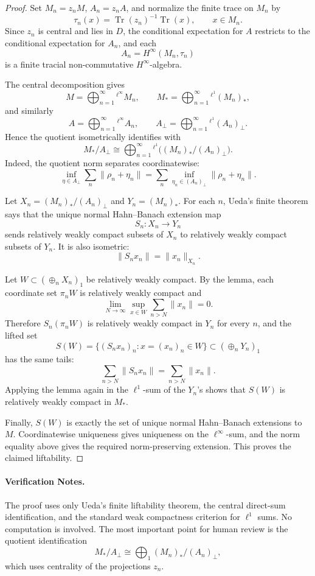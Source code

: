 \documentclass[11pt]{article}
\begin{document}
\begin{proof}
Set \(M_n=z_nM\), \(A_n=z_nA\), and normalize the finite trace on \(M_n\) by
\[
\tau_n(x)=\operatorname{Tr}(z_n)^{-1}\operatorname{Tr}(x),\qquad x\in M_n.
\]
Since \(z_n\) is central and lies in \(D\), the conditional expectation for
\(A\) restricts to the conditional expectation for \(A_n\), and each
\[
A_n=H^\infty(M_n,\tau_n)
\]
is a finite tracial non-commutative \(H^\infty\)-algebra.

The central decomposition gives
\[
M=\bigoplus_{n=1}^{\infty}{}^{\ell^\infty} M_n,\qquad
M_\ast=\bigoplus_{n=1}^{\infty}{}^{\ell^1} (M_n)_\ast,
\]
and similarly
\[
A=\bigoplus_{n=1}^{\infty}{}^{\ell^\infty} A_n,\qquad
A_\perp=\bigoplus_{n=1}^{\infty}{}^{\ell^1} (A_n)_\perp.
\]
Hence the quotient isometrically identifies with
\[
M_\ast/A_\perp
\cong
\bigoplus_{n=1}^{\infty}{}^{\ell^1}
\big((M_n)_\ast/(A_n)_\perp\big).
\]
Indeed, the quotient norm separates coordinatewise:
\[
\inf_{\eta\in A_\perp}\sum_n \|\rho_n+\eta_n\|
=
\sum_n \inf_{\eta_n\in(A_n)_\perp}\|\rho_n+\eta_n\|.
\]

Let \(X_n=(M_n)_\ast/(A_n)_\perp\) and \(Y_n=(M_n)_\ast\).  For each \(n\),
Ueda's finite theorem says that the unique normal Hahn--Banach extension map
\[
S_n:X_n\to Y_n
\]
sends relatively weakly compact subsets of \(X_n\) to relatively weakly
compact subsets of \(Y_n\).  It is also isometric:
\[
\|S_n x_n\|=\|x_n\|_{X_n}.
\]

Let \(W\subset(\oplus_n X_n)_1\) be relatively weakly compact.  By the lemma,
each coordinate set \(\pi_n W\) is relatively weakly compact and
\[
\lim_{N\to\infty}\sup_{x\in W}\sum_{n>N}\|x_n\|=0.
\]
Therefore \(S_n(\pi_n W)\) is relatively weakly compact in \(Y_n\) for every
\(n\), and the lifted set
\[
S(W)=\{(S_nx_n)_n:x=(x_n)_n\in W\}\subset(\oplus_nY_n)_1
\]
has the same tails:
\[
\sum_{n>N}\|S_nx_n\|=\sum_{n>N}\|x_n\|.
\]
Applying the lemma again in the \(\ell^1\)-sum of the \(Y_n\)'s shows that
\(S(W)\) is relatively weakly compact in \(M_\ast\).

Finally, \(S(W)\) is exactly the set of unique normal Hahn--Banach extensions
to \(M\).  Coordinatewise uniqueness gives uniqueness on the
\(\ell^\infty\)-sum, and the norm equality above gives the required
norm-preserving extension.  This proves the claimed liftability.
\end{proof}

\paragraph{Verification Notes.}
The proof uses only Ueda's finite liftability theorem, the central direct-sum
identification, and the standard weak compactness criterion for \(\ell^1\)
sums.  No computation is involved.  The most important point for human review
is the quotient identification
\[
M_\ast/A_\perp\cong\bigoplus_1 (M_n)_\ast/(A_n)_\perp,
\]
which uses centrality of the projections \(z_n\).
\end{document}
